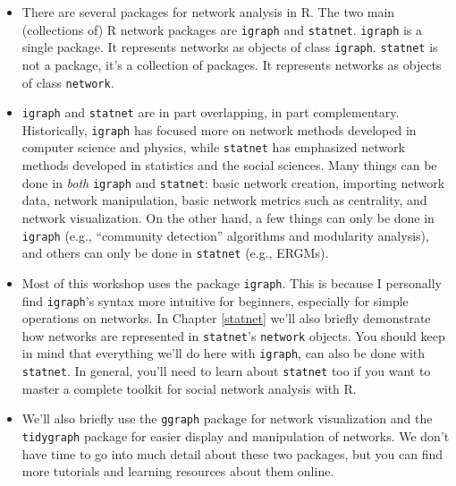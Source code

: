 \documentclass[
]{book}
\providecommand{\tightlist}{%
  \setlength{\itemsep}{0pt}\setlength{\parskip}{0pt}}
\begin{document}
\begin{itemize}
\tightlist
\item
  There are several packages for network analysis in R. The two main (collections of) R network packages are \texttt{igraph} and \texttt{statnet}. \texttt{igraph} is a single package. It represents networks as objects of class \texttt{igraph}. \texttt{statnet} is not a package, it's a collection of packages. It represents networks as objects of class \texttt{network}.
\item
  \texttt{igraph} and \texttt{statnet} are in part overlapping, in part complementary. Historically, \texttt{igraph} has focused more on network methods developed in computer science and physics, while \texttt{statnet} has emphasized network methods developed in statistics and the social sciences. Many things can be done in \emph{both} \texttt{igraph} and \texttt{statnet}: basic network creation, importing network data, network manipulation, basic network metrics such as centrality, and network visualization. On the other hand, a few things can only be done in \texttt{igraph} (e.g., ``community detection'' algorithms and modularity analysis), and others can only be done in \texttt{statnet} (e.g., ERGMs).
\item
  Most of this workshop uses the package \texttt{igraph}. This is because I personally find \texttt{igraph}'s syntax more intuitive for beginners, especially for simple operations on networks. In Chapter \ref{statnet} we'll also briefly demonstrate how networks are represented in \texttt{statnet}'s \texttt{network} objects. You should keep in mind that everything we'll do here with \texttt{igraph}, can also be done with \texttt{statnet}. In general, you'll need to learn about \texttt{statnet} too if you want to master a complete toolkit for social network analysis with R.
\item
  We'll also briefly use the \texttt{ggraph} package for network visualization and the \texttt{tidygraph} package for easier display and manipulation of networks. We don't have time to go into much detail about these two packages, but you can find more tutorials and learning resources about them online.


\end{itemize}
\end{document}
